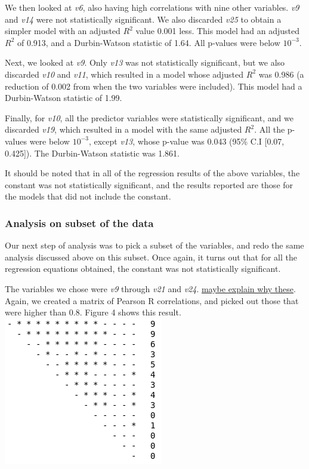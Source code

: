 \documentclass[12pt,a4paper,twocolumn]{article}
\begin{document}
We then looked at \textit{v6}, also having high correlations with nine other variables. \textit{v9} and \textit{v14} were not statistically significant. We also discarded \textit{v25} to obtain a simpler model with an adjusted $R^2$ value 0.001 less. This model had an adjusted $R^2$ of 0.913, and a Durbin-Watson statistic of 1.64. All p-values were below $10^{-3}$.

Next, we looked at \textit{v9}. Only \textit{v13} was not statistically significant, but we also discarded \textit{v10} and \textit{v11}, which resulted in a model whose adjusted $R^2$ was 0.986 (a reduction of 0.002 from when the two variables were included). This model had a Durbin-Watson statistic of 1.99.

Finally, for \textit{v10}, all the predictor variables were statistically significant, and we discarded \textit{v19}, which resulted in a model with the same adjusted $R^2$. All the p-values were below $10^{-3}$, except \textit{v13}, whose p-value was 0.043 (95\% C.I [0.07, 0.425]). The Durbin-Watson statistic was 1.861.

It should be noted that in all of the regression results of the above variables, the constant was not statistically significant, and the results reported are those for the models that did not include the constant.

\subsubsection{Analysis on subset of the data}
Our next step of analysis was to pick a subset of the variables, and redo the same analysis discussed above on this subset. Once again, it turns out that for all the regression equations obtained, the constant was not statistically significant.

The variables we chose were \textit{v9} through \textit{v21} and \textit{v24}. \underline{maybe explain why these}. Again, we created a matrix of Pearson R correlations, and picked out those that were higher than 0.8. Figure 4 shows this result. \\

\includegraphics[scale=0.6]{fig4.png}
\begingroup
{}
\endgroup
\hfill\break
\end{document}
